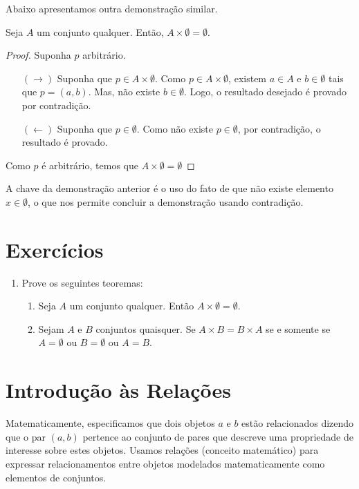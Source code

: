 Abaixo apresentamos outra demonstração similar.

\begin{Theorem}
Seja $A$ um conjunto qualquer. Então, $A \times \emptyset =
\emptyset$.
\end{Theorem}
\begin{proof}
Suponha $p$ arbitrário.
\begin{itemize}
    \item[$(\to)$] Suponha que $p \in A \times \emptyset$. Como $p \in
      A \times \emptyset$, existem $a \in A$ e $b\in \emptyset$ tais
      que $p = (a,b)$. Mas, não existe $b\in\emptyset$. Logo, o
      resultado desejado é provado por contradição.
    \item[$(\leftarrow)$] Suponha que $p \in \emptyset$. Como não
      existe $p\in\emptyset$, por contradição, o resultado é provado.
\end{itemize}
Como $p$ é arbitrário, temos que $A \times \emptyset = \emptyset$
\end{proof}

\begin{Commentary}
A chave da demonstração anterior é o uso do fato de que não existe
elemento $x \in \emptyset$, o que nos permite concluir a demonstração
usando contradição.
\end{Commentary}
\section{Exercícios}

\begin{enumerate}
  \item Prove os seguintes teoremas:
  \begin{enumerate}
    \item Seja $A$ um conjunto qualquer. Então $A \times \emptyset =
      \emptyset$.
    \item Sejam $A$ e $B$ conjuntos quaisquer. Se $A \times B =
      B\times A$ se e somente se $A = \emptyset$ ou $B = \emptyset$ ou
      $A = B$.
  \end{enumerate}
\end{enumerate}

\section{Introdução às Relações}

Matematicamente, especificamos que dois objetos $a$ e $b$ estão
relacionados dizendo que o par $(a,b)$ pertence ao conjunto de pares
que descreve uma propriedade de interesse sobre estes objetos. Usamos
relações (conceito matemático) para expressar relacionamentos entre
objetos modelados matematicamente como elementos de conjuntos.

